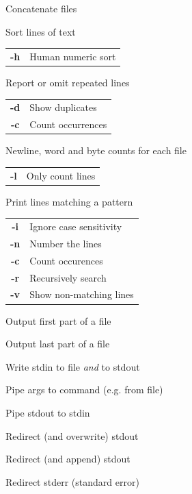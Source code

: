 \documentclass[12pt, a4paper]
{article}
\begin{document}
\begin{multicols}{3}
		\begin{description}[nolistsep]
			\item[cat] Concatenate files
			\item[sort] Sort lines of text
			\item
			\begin{tabular}{cl}
				{\large \ttfamily \textbf{-h}} & Human numeric sort
			\end{tabular}
			\item[uniq] Report or omit repeated lines
			\item
			\begin{tabular}{cl}
				{\large \ttfamily \textbf{-d}} & Show duplicates \\
				{\large \ttfamily \textbf{-c}} & Count occurrences
			\end{tabular}
			\item[wc] Newline, word and byte counts for each file
			\item
			\begin{tabular}{cl}
				{\large \ttfamily \textbf{-l}} & Only count lines
			\end{tabular}
			\item[grep] Print lines matching a pattern
			\item
			\begin{tabular}{cl}
				{\large \ttfamily \textbf{-i}} & Ignore case sensitivity \\
				{\large \ttfamily \textbf{-n}} & Number the lines \\
				{\large \ttfamily \textbf{-c}} & Count occurences \\
				{\large \ttfamily \textbf{-r}} & Recursively search \\
				{\large \ttfamily \textbf{-v}} & Show non-matching lines
			\end{tabular}
			\item[head] Output first part of a file
			\item[tail] Output last part of a file
			\item[tee] Write stdin to file \emph{and} to stdout
			\item[xargs] Pipe args to command (e.g. from file)
		\end{description}
		
		
		\begin{description}[nolistsep]
			\item[|] Pipe stdout to stdin
			\item[>] Redirect (and overwrite) stdout
			\item[>>] Redirect (and append) stdout 
			\item[2>] Redirect stderr (standard error)
		\end{description}
		

\end{multicols}
\end{document}
